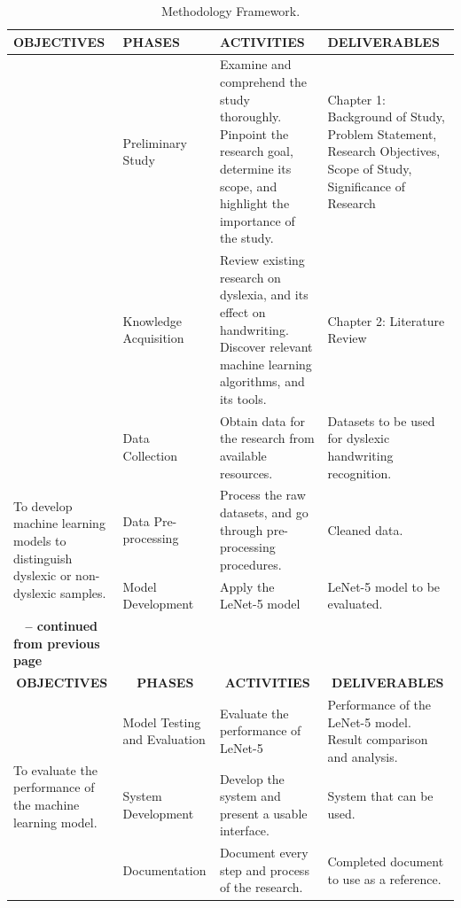 \begin{longtable}{|p{3cm}|p{3cm}|p{3.5cm}|p{4cm}|}
    \caption{Methodology Framework.\label{long}}
\label{table:methodologyframework}\\
\hline
\textbf{OBJECTIVES} & \textbf{PHASES} & \textbf{ACTIVITIES} & \textbf{DELIVERABLES} \\ [0.5ex] 
\hline
\endfirsthead
\hline
\endhead
\hline
\endfoot
\endlastfoot

 \multirow{3}{3cm}{To identify the features of dyslexia handwriting in images.} & Preliminary Study & Examine and comprehend the study thoroughly. Pinpoint the research goal, determine its scope, and highlight the importance of the study. & Chapter 1: Background of Study, Problem Statement, Research Objectives, Scope of Study, Significance of Research\\\cline{2-4} 
 & Knowledge Acquisition & Review existing research on dyslexia, and its effect on handwriting. Discover relevant machine learning algorithms, and its tools. & Chapter 2: Literature Review \\\cline{2-4} 
 & Data Collection & Obtain data for the research from available resources. & Datasets to be used for dyslexic handwriting recognition. \\
 \hline
\multirow{2}{3cm}{To develop machine learning models to distinguish dyslexic or non-
dyslexic samples.} & Data Pre-processing & Process the raw datasets, and go through pre-processing procedures.  & Cleaned data. \\\cline{2-4} 
 & Model Development & Apply the LeNet-5 model & LeNet-5 model to be evaluated. \\
 
 \newpage
 \multicolumn{4}{c}%
{{\bfseries \tablename\ \thetable{} -- continued from previous page}} \\
\hline \multicolumn{1}{|c|}{\textbf{OBJECTIVES}} & \multicolumn{1}{c|}{\textbf{PHASES}} & \multicolumn{1}{c|}{\textbf{ACTIVITIES}} & \multicolumn{1}{c|}{\textbf{DELIVERABLES}} \\ \hline
 \multirow{3}{3cm}{To evaluate the performance of the machine learning model.} & Model Testing and Evaluation & Evaluate the performance of LeNet-5 & Performance of the LeNet-5 model. Result comparison and analysis. \\\cline{2-4} 
 & System Development & Develop the system and present a usable interface. & System that can be used. \\\cline{2-4}
 & Documentation & Document every step and process of the research. & Completed document to use as a reference. \\
 \hline

\end{longtable}


